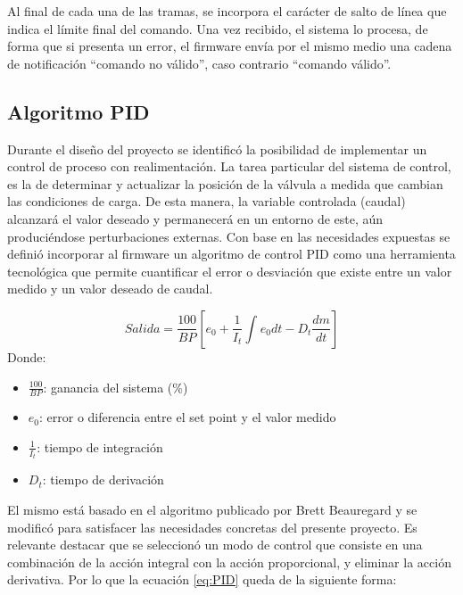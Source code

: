 Al final de cada una de las tramas, se incorpora el carácter de salto de línea que indica el límite final del comando. Una vez recibido, el sistema lo procesa, de forma que si presenta un error, el firmware envía por el mismo medio una cadena de notificación “comando no válido”, caso contrario “comando válido”. 

\subsection{Algoritmo PID}
\label{subsec:Algoritmo PID}

Durante el diseño del proyecto se identificó la posibilidad de implementar un control de proceso con realimentación. La tarea particular del sistema de control, es la de determinar y actualizar la posición de la válvula a medida que cambian las condiciones de carga. De esta manera, la variable controlada (caudal) alcanzará el valor deseado y permanecerá en un entorno de este, aún produciéndose perturbaciones externas. Con base en las necesidades expuestas se definió incorporar al firmware un algoritmo de control PID \citep{PROCESODECONTROL} como una herramienta tecnológica que permite cuantificar el error o desviación que existe entre un valor medido y un valor deseado de caudal. 

\begin{equation}
 \label{eq:PID}
Salida =  \frac{100}{BP} [e_{0}+ \frac{1}{I_{t}} \int_{}^{} e_{0} dt - D_{t} \frac{dm}{dt}]
\end{equation}
Donde:\\ 
\begin{itemize}


\item $\frac{100}{BP}$: ganancia del sistema (\%) 
\item ${e_{0}}$:  error o diferencia entre el set point y el valor medido 
\item $\frac{1}{I_{t}}$: tiempo de integración
\item ${D_{t}}$: tiempo de derivación


\end{itemize}


El mismo está basado en el algoritmo publicado por Brett Beauregard \citep{ALGORITMOPID} y se modificó para satisfacer las necesidades concretas del presente proyecto. Es relevante destacar que se seleccionó un modo de control que consiste en una combinación de la acción integral con la acción proporcional, y eliminar la acción derivativa. Por lo que la ecuación \ref{eq:PID} queda de la siguiente forma:
   
